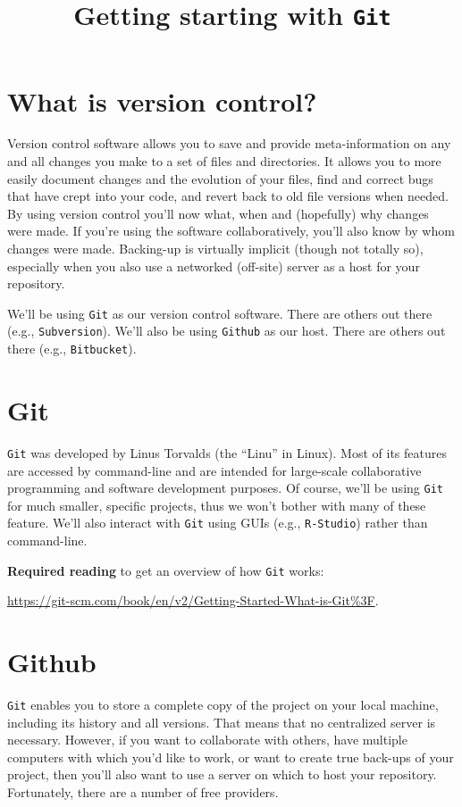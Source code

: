 \documentclass[12pt,letterpaper]{article}
\title{Getting starting with \texttt{Git}}
\begin{document}
\maketitle

\tableofcontents

\pagebreak


\section{What is version control?}
Version control software allows you to save and provide meta-information on any and all changes you make to a set of files and directories.  It allows you to more easily document changes and the evolution of your files, find and correct bugs that have crept into your code, and revert back to old file versions when needed.  By using version control you'll now what, when and (hopefully) why changes were made.  If you're using the software collaboratively, you'll also know by whom changes were made.  Backing-up is virtually implicit (though not totally so), especially when you also use a networked (off-site) server as a host for your repository.

We'll be using \texttt{Git} as our version control software.  There are others out there (e.g., \texttt{Subversion}).  We'll also be using \texttt{Github} as our host.  There are others out there (e.g., \texttt{Bitbucket}).

\section{Git}
\texttt{Git} was developed by Linus Torvalds (the ``Linu'' in Linux).  Most of its features are accessed by command-line and are intended for large-scale collaborative programming and software development purposes.  Of course, we'll be using \texttt{Git} for much smaller, specific projects, thus we won't bother with many of these feature.  We'll also interact with \texttt{Git} using GUIs (e.g., \texttt{R-Studio}) rather than command-line.

\textbf{Required reading} to get an overview of how \texttt{Git} works:\\
\begin{footnotesize}
  \url{https://git-scm.com/book/en/v2/Getting-Started-What-is-Git%3F}.
\end{footnotesize}

\section{Github}
\texttt{Git} enables you to store a complete copy of the project on your local machine, including its history and all versions.  That means that no centralized server is necessary.  However, if you want to collaborate with others, have multiple computers with which you'd like to work, or want to create true back-ups of your project, then you'll also want to use a server on which to host your repository.  Fortunately, there are a number of free providers.
\end{document}
